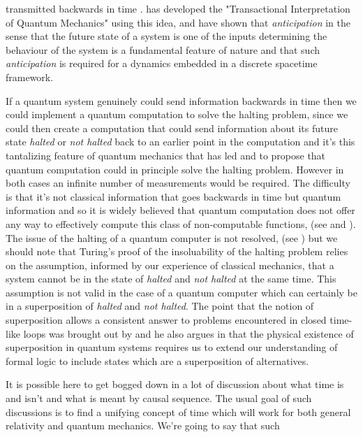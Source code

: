 \documentclass[
   ,final            %
  ]
  {aipproc}
\begin{document}
transmitted backwards in time \citet{penrose_98}.  \citet{Cramer_jg,Cramer_casys} has developed the "Transactional Interpretation of Quantum %
Mechanics" using this idea, and \citet*{Antippa_dubois_2004} have shown that \emph{anticipation} in the sense that the future state of a system is one %
of the inputs determining the behaviour of the system is a fundamental feature of nature and that such \emph{anticipation} is required for a dynamics %
embedded in a discrete spacetime framework.
\par
If a quantum system genuinely could send information backwards in time then we could implement a quantum computation to solve the halting problem, %
since we could then create a computation that could send information about its future state \emph{halted} or \emph{not halted} back to an earlier %
point in the computation and it's this tantalizing feature of quantum mechanics that has led  \citet{Kieu} and  \citet{Calude_turing_barrier} to %
propose that quantum computation could in principle solve the halting problem. However in both cases an infinite number of measurements would be %
required. The difficulty is that it's not classical information that goes backwards in time but quantum information and so
it is widely believed that quantum computation does not offer any way to effectively compute this class of
non-computable functions, (see \citet{bennet_and_bernstein} and \citet{Margolus_03}). The issue of the halting of a quantum computer is not resolved, %
(see \citet{linden_popescu}) but we should note that Turing's proof \cite{Turing} of the insoluability of the halting
problem relies on the assumption, informed by our experience of classical mechanics, that a system cannot
be in the state of \emph{halted} and \emph{not halted} at the same time. This assumption is not valid in the case of a quantum computer
which can certainly be in a superposition of \emph{halted} and \emph{not halted}. The point that the notion of superposition allows a consistent %
answer to problems encountered in closed time-like loops was brought out by \citet{Deutsch_91} and he also argues in %
\citet{deutsch_ekert_lupacchini_00} that the physical existence of superposition in quantum systems requires us to extend our understanding of formal %
logic to include states which are a superposition of alternatives. 
\par
It is possible here to get bogged down in a lot of discussion about what time is and isn't and what is meant by causal sequence. The usual goal of %
such discussions is to find a unifying concept of time which will work for both general relativity and quantum mechanics. We're going to say that such %
\end{document}
